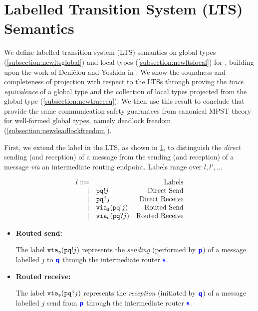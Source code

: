 \section{Labelled Transition System (LTS) Semantics}
\label{section:lts}

We define labelled transition system (LTS) semantics
on global types (\cref{subsection:newltsglobal}) 
and local types (\cref{subsection:newltslocal})
for \newtheory,
building upon the work of Deni\'elou and Yoshida in
\cite{characterisation}.
We show the soundness and completeness of projection
with respect to the LTSs through proving the
\textit{trace equivalence} of
a global type and the collection of local types projected
from the global type (\cref{subsection:newtraceeq}).
We then use this result to
conclude that \newtheory provide the same
communication safety guarantees from canonical
MPST theory for well-formed global types, 
namely deadlock freedom (\cref{subsection:newdeadlockfreedom}).

First, we extend the label in the LTS, as shown in 
\cref{fig:newlts}, to distinguish
the \textit{direct} sending (and reception) of a message
from the sending (and reception) of a message
\textit{via} an intermediate routing endpoint.
Labels range over $l, l', \dots$

\begin{figure}[!h]
\doublespacing
\[
\begin{array}{rlr}
l ::= & & \text{Labels} \\
	\mid & {\mathtt{p}}{\mathtt{q}}!{j} & 
		\text{Direct Send} \\
	\mid & {\mathtt{p}}{\mathtt{q}}?{j} & 
		\text{Direct Receive} \\
	\mid & {\texttt{via}_{{\mathtt{s}}}({{\mathtt{p}}{\mathtt{q}}!{j}})} & 
		\text{Routed Send} \\
	\mid & {\texttt{via}_{{\mathtt{s}}}({{\mathtt{p}}{\mathtt{q}}?{j}})} & 
		\text{Routed Receive} \\
\end{array}
\]
\singlespacing
{}
\label{fig:newlts}
\end{figure}

\begin{itemize}
\item \textbf{Routed send:}

The label ${\texttt{via}_{{\mathtt{s}}}({{\mathtt{p}}{\mathtt{q}}!{j}})}$ represents the
\textit{sending} (performed by ${\color{blue}\bm{\mathsf{p}}}$)
of a message labelled $j$ to ${\color{blue}\bm{\mathsf{q}}}$ through
the intermediate router ${\color{blue}\bm{\mathsf{s}}}$.

\item \textbf{Routed receive:}

The label ${\texttt{via}_{{\mathtt{s}}}({{\mathtt{p}}{\mathtt{q}}?{j}})}$ represents the
\textit{reception} (initiated by ${\color{blue}\bm{\mathsf{q}}}$) 
of a message labelled $j$
send from ${\color{blue}\bm{\mathsf{p}}}$ through
the intermediate router ${\color{blue}\bm{\mathsf{s}}}$.
\end{itemize}

